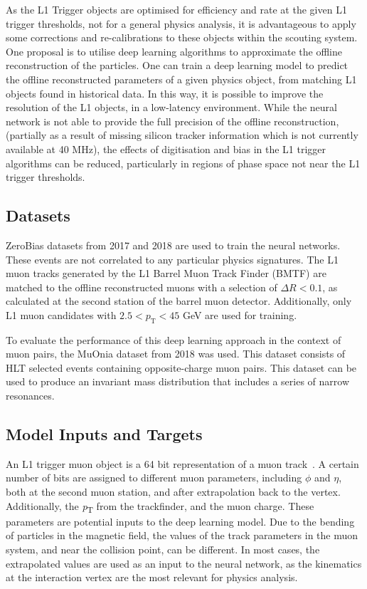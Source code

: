\documentclass[10pt, paper=a4, UKenglish]{article}
\begin{document}
As the L1 Trigger objects are optimised for efficiency and rate at the given L1 trigger thresholds, not for a general physics analysis, it is advantageous to apply some corrections and re-calibrations to these objects within the scouting system. One proposal is to utilise deep learning algorithms to approximate the offline reconstruction of the particles. 
One can train a deep learning model to predict the offline reconstructed parameters of a given physics object, from matching L1 objects found in historical data. In this way, it is possible to improve the resolution of the L1 objects, in a low-latency environment. While the neural network is not able to provide the full precision of the offline reconstruction, (partially as a result of missing silicon tracker information which is not currently available at 40 MHz), the effects of digitisation and bias in the L1 trigger algorithms can be reduced, particularly in regions of phase space not near the L1 trigger thresholds. 



\subsection{Datasets}

ZeroBias datasets from 2017 and 2018 are used to train the neural networks. These events are not correlated to any particular physics signatures. The L1 muon tracks generated by the L1 Barrel Muon Track Finder (BMTF) are matched to the offline reconstructed muons with a selection of $\Delta R < 0.1 $, as calculated at the second station of the barrel muon detector. Additionally, only L1 muon candidates with $2.5 < p_\mathrm{T} < 45$ GeV are used for training.

To evaluate the performance of this deep learning approach in the context of muon pairs, the MuOnia dataset from 2018 was used. This dataset consists of HLT selected events containing opposite-charge muon pairs. This dataset can be used to produce an invariant mass distribution that includes a series of narrow resonances. 

\subsection{Model Inputs and Targets}

An L1 trigger muon object is a 64 bit representation of a muon track~\cite{DN2014}. A certain number of bits are assigned to different muon parameters, including $\phi$ and $\eta$, both at the second muon station, and after extrapolation back to the vertex. Additionally, the \textit{p}\textsubscript{T} from the trackfinder, and the muon charge. These parameters are potential inputs to the deep learning model. Due to the bending of particles in the magnetic field, the values of the track parameters in the muon system, and near the collision point, can be different. In most cases, the extrapolated values are used as an input to the neural network, as the kinematics at the interaction vertex are the most relevant for physics analysis.
\end{document}
